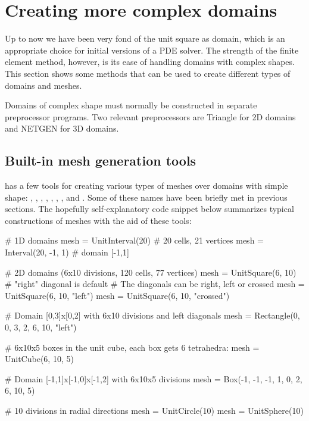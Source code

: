 \section{Creating more complex domains}
\label{langtangen:prepro}

Up to now we have been very fond of the unit square as domain, which is
an appropriate choice for initial versions of a PDE solver. The strength
of the finite element method, however, is its ease of handling domains
with complex shapes. This section shows some methods that can be used
to create different types of domains and meshes.

Domains of complex shape must normally be constructed in separate
preprocessor programs. Two relevant preprocessors are Triangle for 2D
domains and NETGEN for 3D domains.

\subsection{Built-in mesh generation tools}
\label{langtangen:prepro:builtin}

\dolfin{} has a few tools for creating various types of meshes over domains
with simple shape:
,
,
,
,
,
,
,\vadjust{\clearpage} and
.
Some of these names have been briefly met in previous sections.
The hopefully self-explanatory code snippet below summarizes typical
constructions of meshes with the aid of these tools:
\begin{python}
# 1D domains
mesh = UnitInterval(20)     # 20 cells, 21 vertices
mesh = Interval(20, -1, 1)  # domain [-1,1]

# 2D domains (6x10 divisions, 120 cells, 77 vertices)
mesh = UnitSquare(6, 10)  # "right" diagonal is default
# The diagonals can be right, left or crossed
mesh = UnitSquare(6, 10, "left")
mesh = UnitSquare(6, 10, "crossed")

# Domain [0,3]x[0,2] with 6x10 divisions and left diagonals
mesh = Rectangle(0, 0, 3, 2, 6, 10, "left")

# 6x10x5 boxes in the unit cube, each box gets 6 tetrahedra:
mesh = UnitCube(6, 10, 5)

# Domain [-1,1]x[-1,0]x[-1,2] with 6x10x5 divisions
mesh = Box(-1, -1, -1, 1, 0, 2, 6, 10, 5)

# 10 divisions in radial directions
mesh = UnitCircle(10)
mesh = UnitSphere(10)
\end{python}

